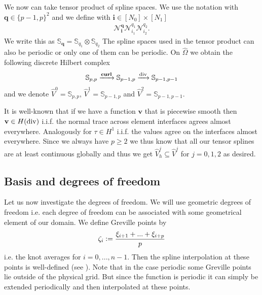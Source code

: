 \documentclass[../master_thesis.tex]{subfiles}
\begin{document}
We now can take tensor product of spline spaces. We use the notation 
with $\mathbf{q} \in \{p-1,p\}^2$ and we define with $\mathbf{i} \in [N_0 ] \times [ N_1 ]$
\begin{align*}
    \mathcal{N}_\mathbf{i}^\mathbf{q} \mathcal{N}_{i_1}^{q_1} \mathcal{N}_{i_2}^{q_2}.
\end{align*}
We write this as $\mathbb{S}_\mathbf{q} = \mathbb{S}_{q_1} \otimes \mathbb{S}_{q_2}$ 
The spline spaces used in the tensor product can also be periodic or only one of them 
can be periodic.
On $\hat{\Omega}$ we obtain the following discrete Hilbert complex 
\begin{align*}
    \mathbb{S}_{p,p} \xrightarrow{\veccurl} \mathbb{S}_{p-1,p} \xrightarrow{\diver} \mathbb{S}_{p-1,p-1}
\end{align*}
and we denote $\hat{V}^0 = \mathbb{S}_{p,p}$, $\hat{V}^1 = \mathbb{S}_{p-1,p}$ 
and $\hat{V}^2 = \mathbb{S}_{p-1,p-1}$. 

It is well-known that if we have a function $\mathbf{v}$ that is piecewise smooth 
then $\mathbf{v} \in H(\operatorname{div})$ i.i.f. the normal trace across element interfaces
agrees almost everywhere. Analogously for $\tau \in H^1$ i.i.f. the values agree 
on the interfaces almost everywhere. Since we always have $p \geq 2$ we thus know that 
all our tensor splines are at least continuous globally and thus we get 
$\hat{V}_h^j \subseteq \hat{V}^j$ for $j=0,1,2$ as desired. 

\subsection{Basis and degrees of freedom}


Let us now investigate the degrees of freedom. We will use geometric degrees of 
freedom i.e. each degree of freedom can be associated with some geometrical element of our 
domain. We define Greville points by 
\begin{align*}
    \zeta_i \vcentcolon= \frac{\xi_{i+1} + ... + \xi_{i+p}}{p}
\end{align*}
i.e. the knot averages for $i=0,...,n-1$. Then the spline interpolation at these 
points is well-defined (see \cite{I think that was in the isogeometric analysis book}).
Note that in the case periodic some Greville points lie outside of 
the physical grid. But since the function is periodic it can simply be extended periodically 
and then interpolated at these points. 
\end{document}
